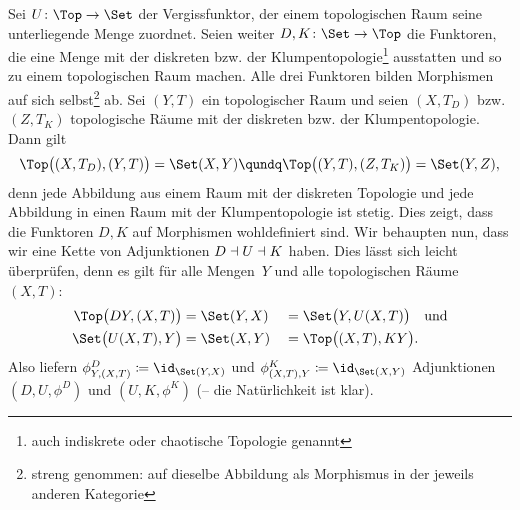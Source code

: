 \begin{thBeispiel}
    \label{ch1:bsp:TopVergiss}
    Sei $U\colon\Top\to\Set$ der Vergissfunktor, der einem topologischen Raum
    seine unterliegende Menge zuordnet. Seien weiter $D,K\colon\Set\to\Top$ die
    Funktoren, die eine Menge mit der diskreten bzw. der
    Klumpentopologie\footnote{auch indiskrete oder chaotische Topologie genannt}
    ausstatten und so zu einem topologischen Raum machen. Alle drei Funktoren
    bilden Morphismen auf sich selbst\footnote{streng genommen: auf dieselbe
    Abbildung als Morphismus in der jeweils anderen Kategorie} ab.
    Sei $(Y,T)$ ein topologischer Raum und seien $(X,T_D)$ bzw. $(Z,T_K)$
    topologische Räume mit der diskreten bzw. der Klumpentopologie. Dann gilt
    \[  \Top\bigl( (X,T_D), (Y,T) \bigr) = \Set(X,Y)  \qundq
        \Top\bigl( (Y,T), (Z,T_K) \bigr) = \Set(Y,Z)
    , \]
    denn jede Abbildung aus einem Raum mit der diskreten Topologie und jede
    Abbildung in einen Raum mit der Klumpentopologie ist stetig. Dies zeigt,
    dass die Funktoren $D,K$ auf Morphismen wohldefiniert sind. Wir behaupten
    nun, dass wir eine Kette von Adjunktionen $D\dashv U\dashv K$
    haben. Dies lässt sich leicht überprüfen, denn es gilt für alle Mengen~$Y$ 
    und alle topologischen Räume $(X,T)$:
    \begin{alignat*}{2}
        \Top\bigl( DY, (X,T) \bigr) &= \Set(Y,X) &&= \Set\bigl( Y, U(X,T)\bigr)
        \quad\text{und}\\
        \Set\bigl( U(X,T), Y \bigr) &= \Set(X,Y) &&= \Top\bigl( (X,T), KY \bigr)
    . \end{alignat*}
    Also liefern $\phi^D_{Y,(X,T)} \defeq \id_{\Set(Y,X)}$ und 
    $\phi^K_{(X,T),Y} \defeq \id_{\Set(X,Y)}$ Adjunktionen $(D,U,\phi^D)$
    und $(U,K,\phi^K)$ (-- die Natürlichkeit ist klar).
\end{thBeispiel}

